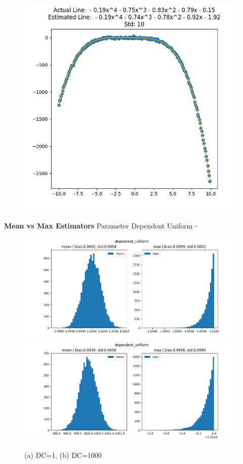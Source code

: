\documentclass[12pt]{article}
\begin{document}
\begin{figure}[H]
\includegraphics[scale=0.33]{pf3.png}  
\end{figure}
\textbf{Mean vs Max Estimators} \newline
Parameter Dependent Uniform - 

\begin{figure}[H] 
\centering 
\includegraphics[scale=0.5]{ce-du-low.png}
\includegraphics[scale=0.5]{ce-du-hi.png}
\caption{(a) DC=1, (b) DC=1000}
\end{figure}
\end{document}
